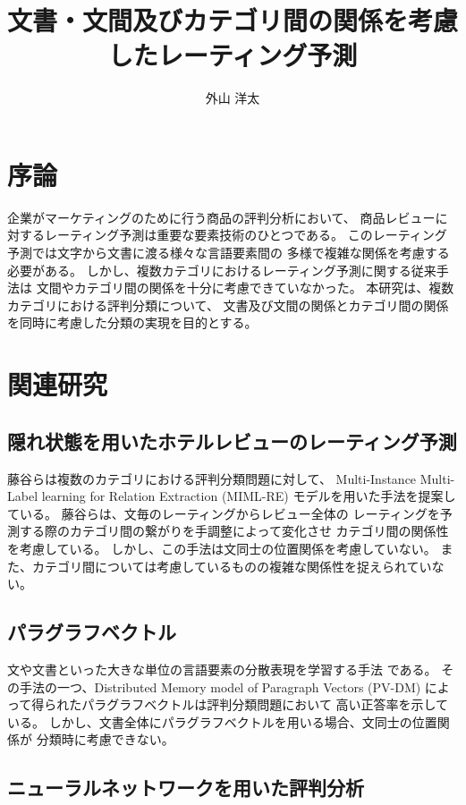 \documentclass{ttisummary}
\title{文書・文間及びカテゴリ間の関係を考慮したレーティング予測}
\author{外山 洋太}
\begin{document}
\section{序論}

企業がマーケティングのために行う商品の評判分析において、
商品レビューに対するレーティング予測は重要な要素技術のひとつである。
このレーティング予測では文字から文書に渡る様々な言語要素間の
多様で複雑な関係を考慮する必要がある。
しかし、複数カテゴリにおけるレーティング予測に関する従来手法\cite{fujitani15}は
文間やカテゴリ間の関係を十分に考慮できていなかった。
本研究は、複数カテゴリにおける評判分類について、
文書及び文間の関係とカテゴリ間の関係を同時に考慮した分類の実現を目的とする。



\section{関連研究}

\subsection{隠れ状態を用いたホテルレビューのレーティング予測}

藤谷ら\cite{fujitani15}は複数のカテゴリにおける評判分類問題に対して、
Multi-Instance Multi-Label learning for Relation Extraction (MIML-RE)
\cite{mihai12}モデルを用いた手法を提案している。
藤谷ら\cite{fujitani15}は、文毎のレーティングからレビュー全体の
レーティングを予測する際のカテゴリ間の繋がりを手調整によって変化させ
カテゴリ間の関係性を考慮している。
しかし、この手法は文同士の位置関係を考慮していない。
また、カテゴリ間については考慮しているものの複雑な関係性を捉えられていない。


\subsection{パラグラフベクトル}

文や文書といった大きな単位の言語要素の分散表現を学習する手法\cite{quoc14}
である。
その手法の一つ、Distributed Memory model of Paragraph Vectors (PV-DM)
によって得られたパラグラフベクトルは評判分類問題において
高い正答率を示している\cite{quoc14}。
しかし、文書全体にパラグラフベクトルを用いる場合、文同士の位置関係が
分類時に考慮できない。


\subsection{ニューラルネットワークを用いた評判分析}
\end{document}
